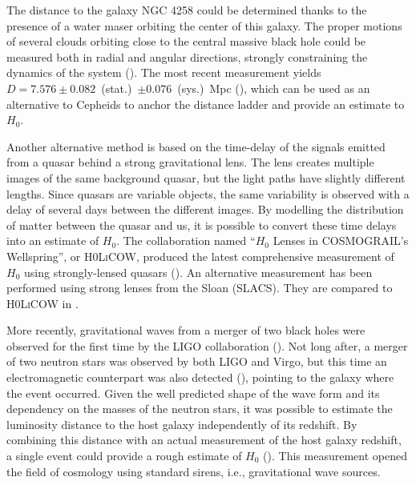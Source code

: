     The distance to the galaxy NGC 4258 could be determined thanks to the presence of a 
    water maser orbiting the center of this galaxy. The proper motions of several
    clouds orbiting close to the central massive black hole could be measured both 
    in radial and angular directions, strongly constraining the dynamics of the system
    (\cite{herrnsteinGeometricDistanceGalaxy1999b}).
    The most recent measurement yields $D = 7.576\pm0.082$~(stat.)~$\pm0.076$~(sys.)~Mpc
    (\cite{reidImprovedDistanceNGC2019}), which can be used as an alternative
    to Cepheids to anchor the 
    distance ladder and provide an estimate to $H_0$. 


    Another alternative method is based on the time-delay of the signals emitted from 
    a quasar behind a strong gravitational lens. The lens creates multiple images of the
    same background quasar, but the light paths have slightly different lengths. 
    Since quasars are variable objects, the same variability is observed with a delay of 
    several days between the different images. 
    By modelling the distribution of matter between the quasar and us, 
    it is possible to convert these time delays into an estimate of $H_0$.
    The collaboration named ``$H_0$ Lenses in COSMOGRAIL's Wellspring'', or \textsc{H0LiCOW}, 
    produced the latest comprehensive measurement of $H_0$ using strongly-lensed quasars
    (\cite{wongH0LiCOWXIIICent2019}). 
    An alternative measurement has been performed using strong lenses from the Sloan (SLACS). 
    They are compared to \textsc{H0LiCOW} in \cite{birrerTDCOSMOIVHierarchical2020}. 
    
    More recently, gravitational waves from a merger of two black holes were 
    observed for the first time by the LIGO collaboration
    (\cite{theligoscientificcollaborationObservationGravitationalWaves2016}). 
    Not long after, a merger of two neutron stars was observed by both LIGO and Virgo,
    but this time an electromagnetic counterpart was also detected
    (\cite{theligoscientificcollaborationGW170817ObservationGravitational2017}), 
    pointing to the galaxy where the event occurred. Given the well predicted 
    shape of the wave form and its dependency on the masses of the neutron stars,
    it was possible to estimate the luminosity distance to the host galaxy independently of its redshift. 
    By combining this distance with an actual measurement of the host galaxy redshift, 
    a single event could provide a rough estimate of $H_0$ 
    (\cite{abbottGravitationalwaveStandardSiren2017b}). 
    This measurement opened the field of cosmology using standard sirens, i.e., gravitational wave sources. 

